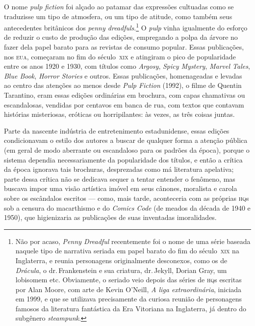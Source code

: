O nome \emph{pulp fiction} foi alçado ao patamar das expressões
cultuadas como se traduzisse um tipo de atmosfera, ou um tipo de
atitude, como também seus antecedentes britânicos dos \emph{penny
dreadfuls}.\footnote{Não por acaso, \emph{Penny Dreadful} recentemente
  foi o nome de uma série baseada naquele tipo de narrativa seriada em
  papel barato do fim do século~\textsc{xix} na Inglaterra, e reunia personagens
  originalmente desconexos, como os de \emph{Drácula}, o 
  dr.\,Frankenstein e sua criatura, dr.\,Jekyll, Dorian Gray, um lobisomem
  etc. Obviamente, o seriado veio depois das séries de \textsc{hq}s escritas por
  Alan Moore, com arte de Kevin O'Neill, \emph{A liga extraordinária}, iniciada em 1999, e
  que se utilizava precisamente da curiosa reunião de personagens
  famosos da literatura fantástica da Era Vitoriana na Inglaterra, já
  dentro do subgênero \emph{steampunk}.} O \emph{pulp} vinha igualmente
do esforço de reduzir o custo de produção das edições, empregando a
polpa da árvore no fazer dela papel barato para as revistas de consumo
popular. Essas publicações, nos \textsc{eua}, começaram no fim do século~\textsc{xix}
e atingiram o pico de popularidade entre os anos 1920 e 1930, com
títulos como \emph{Argosy}, \emph{Spicy Mystery}, \emph{Marvel Tales},
\emph{Blue Book}, \emph{Horror Stories} e outros. Essas publicações,
homenageadas e levadas ao centro das atenções ao menos desde \emph{Pulp
Fiction} (1992), o filme de Quentin Tarantino, eram essas edições
ordinárias em brochura, com capas chamativas ou escandalosas, vendidas
por centavos em banca de rua, com textos que contavam histórias
misteriosas, eróticas ou horripilantes: às vezes, as três coisas juntas.

Parte da nascente indústria de entretenimento estadunidense,
essas edições condicionavam o estilo dos autores a buscar de qualquer forma a atenção
pública (em geral de modo aberrante ou escandaloso para os padrões da
época), porque o sistema dependia necessariamente da popularidade dos
títulos, e então a crítica da época ignorava tais brochuras,
desprezadas como má literatura apelativa; parte dessa crítica não se
dedicava sequer a tentar entender o fenômeno, mas buscava impor uma
visão artística imóvel em seus cânones, moralista e carola sobre os
escândalos escritos --- como, mais tarde, aconteceria com as próprias
\textsc{hq}s sob a censura do macarthismo e do \emph{Comics Code} (de meados da
década de 1940 e 1950), que higienizaria as publicações de suas
inventadas imoralidades.

